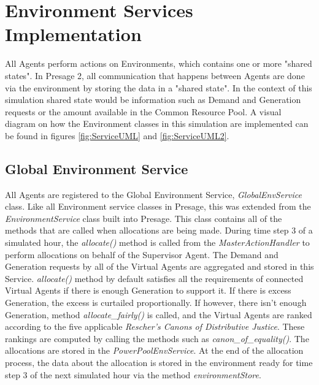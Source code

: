 \section*{Environment Services Implementation}
All Agents perform actions on Environments, which contains one or more "shared states". In Presage 2, all communication that happens between Agents are done via the environment by storing the data in a "shared state". In the context of this simulation shared state would be information such as Demand and Generation requests or the amount available in the Common Resource Pool. A visual diagram on how the Environment classes in this simulation are implemented can be found in figures \ref{fig:ServiceUML} and \ref{fig:ServiceUML2}.

\subsection*{Global Environment Service}
All Agents are registered to the Global Environment Service, \textit{GlobalEnvService} class. Like all Environment service classes in Presage, this was extended from the \textit{EnvironmentService} class built into Presage. This class contains all of the methods that are called when allocations are being made. During time step 3 of a simulated hour, the \textit{allocate()} method is called from the \textit{MasterActionHandler} to perform allocations on behalf of the Supervisor Agent. The Demand and Generation requests by all of the Virtual Agents are aggregated and stored in this Service. \textit{allocate()} method by default satisfies all the requirements of connected Virtual Agents if there is enough Generation to support it. If there is excess Generation, the excess is curtailed proportionally. 
If however, there isn't enough Generation, method \textit{allocate\_fairly()} is called, and the Virtual Agents are ranked according to the five applicable \textit{Rescher's Canons of Distributive Justice}. These rankings are computed by calling the methods such as \textit{canon\_of\_equality()}. The allocations are stored in the \textit{PowerPoolEnvService}.
At the end of the allocation process, the data about the allocation is stored in the environment ready for time step 3 of the next simulated hour via the method \textit{environmentStore}.

